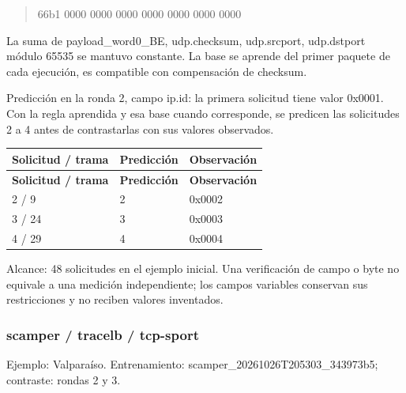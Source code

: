 \begin{quote}\ttfamily\footnotesize\raggedright 66b1 0000 0000 0000 0000 0000 0000 0000\end{quote}
La suma de payload\_\allowbreak{}word0\_\allowbreak{}BE, udp.checksum, udp.srcport, udp.dstport módulo 65535 se mantuvo constante. La base se aprende del primer paquete de cada ejecución, es compatible con compensación de checksum.

Predicción en la ronda 2, campo ip.id: la primera solicitud tiene valor 0x0001. Con la regla aprendida y esa base cuando corresponde, se predicen las solicitudes 2 a 4 antes de contrastarlas con sus valores observados.

\begingroup
\fontsize{9}{11}\selectfont
\addtocounter{table}{-1}
\begin{longtable}{p{3.2cm}p{5.1cm}p{5.1cm}}
\toprule
\textbf{Solicitud / trama} & \textbf{Predicción} & \textbf{Observación} \\ \midrule
\endfirsthead
\toprule
\textbf{Solicitud / trama} & \textbf{Predicción} & \textbf{Observación} \\ \midrule
\endhead
2 / 9 & 2 & 0x0002 \\
3 / 24 & 3 & 0x0003 \\
4 / 29 & 4 & 0x0004 \\
\bottomrule
\end{longtable}
\endgroup
Alcance: 48 solicitudes en el ejemplo inicial. Una verificación de campo o byte no equivale a una medición independiente; los campos variables conservan sus restricciones y no reciben valores inventados.

\subsubsection{scamper / tracelb / tcp-sport}
Ejemplo: Valparaíso. Entrenamiento: scamper\_\allowbreak{}20261026T205303\_\allowbreak{}343973b5; contraste: rondas 2 y 3.

